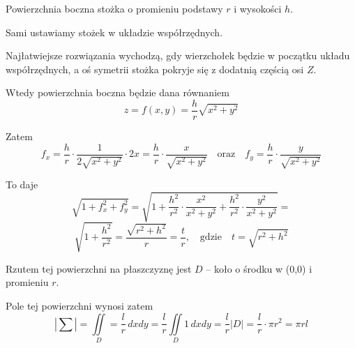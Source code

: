 \begin{przyklad}
    Powierzchnia boczna stożka o promieniu podstawy $r$ i wysokości $h$.

    Sami ustawiamy stożek w układzie współrzędnych.

    Najłatwiejsze rozwiązania wychodzą, gdy wierzchołek będzie w początku układu współrzędnych, a oś symetrii stożka pokryje się z dodatnią częścią osi $Z$.

    Wtedy powierzchnia boczna będzie dana równaniem
    \[ z = f(x,y) = \frac{h}{r} \sqrt{x^2 + y^2} \]

    Zatem
    \[ f_x = \frac{h}{r} \cdot \frac{1}{2 \sqrt{x^2 + y^2}} \cdot 2x = \frac{h}{r} \cdot \frac{x}{\sqrt{x^2 + y^2}} \quad \text{oraz} \quad f_y = \frac{h}{r} \cdot \frac{y}{\sqrt{x^2 + y^2}} \]

    To daje
    \[ \sqrt{1 + f_x^2 + f_y^2} = \sqrt{1 + \frac{h^2}{r^2} \cdot \frac{x^2}{x^2 + y^2} + \frac{h^2}{r^2} \cdot \frac{y^2}{x^2 + y^2}} = \]
    \[ \sqrt{1 + \frac{h^2}{r^2}} = \frac{\sqrt{r^2 + h^2}}{r} = \frac{t}{r}, \quad \text{gdzie} \quad t = \sqrt{r^2 + h^2} \]

    Rzutem tej powierzchni na płaszczyznę jest $D$ -- koło o środku w (0,0) i promieniu $r$.

    Pole tej powierzchni wynosi zatem 
    \[ |\sum| = \iint\limits_D = \frac{l}{r} \, dxdy = \frac{l}{r} \iint\limits_D 1 \, dxdy = \frac{l}{r}|D| = \frac{l}{r} \cdot \pi r^2 = \pi r l \]
\end{przyklad}